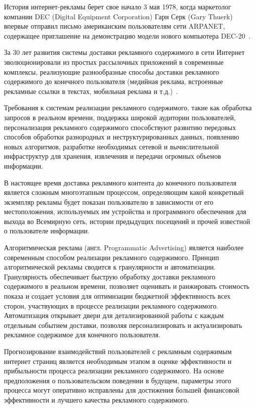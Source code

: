 
История интернет-рекламы берет свое начало 3 мая 1978, когда маркетолог компании DEC (Digital Equipment Corporation) 
Гари Серк (Gary Thuerk) впервые отправил письмо американским пользователям сети ARPANET, содержащее приглашение
на демонстрацию модели нового компьютера DEC-20~\autocite{online:spam}.

За 30 лет развития системы доставки рекламного содержимого в сети Интернет эволюционировали из простых рассылочных
приложений в современные комплексы, реализующие разнообразные способы доставки рекламного содержимого до 
конечного пользователя (медийная реклама, встроенные рекламные ссылки в текстах, мобильная реклама и т.д.)~\autocite{online:google}.

Требования к системам реализации рекламного содержимого, такие как обработка запросов в реальном времени, 
поддержка широкой аудитории пользователей, персонализация рекламного содержимого способствуют развитию
передовых способов обработки разнородных и неструктурированных данных, появлению новых алгоритмов, разработке
необходимых сетевой и вычислительной инфраструктур для хранения, извлечения и передачи огромных объемов информации.

В настоящее время доставка рекламного контента до конечного пользователя является сложным многоэтапным процессом, 
определяющим какой конкретный экземпляр рекламы будет показан пользователю в зависимости от его местоположения,
используемых им устройства и программного обеспечения для выхода во Всемирную сеть, истории предыдущих
посещений и прочей известной о пользователе информации.

Алгоритмическая реклама (англ. Programmatic Advertising) является наиболее современным способом реализации 
рекламного содержимого. Принцип алгоритмической рекламы сводится к гранулярности и автоматизации. Гранулярность
обеспечивает быструю обработку доставки рекламного содержимого в реальном времени, позволяет оценивать и ранжировать
стоимость показа и создает условия для оптимизации бюджетной эффективность всех сторон, участвующих в процессе 
реализации рекламного содержимого. Автоматизация открывает двери для детализированной работы с каждым отдельным событием доставки,
позволяя персонализировать и актуализировать рекламное содержимое для конечного пользователя.

Прогнозирование взаимодействий пользователей с рекламным содержимым интернет страниц является необходимым этапом
в оценке эффективности и прибыльности процесса реализации рекламного содержимого. На основе предположения о 
пользовательском поведении в будущем, параметры этого процесса могут оперативно исправлены для достижения большей
финансовой эффективности и лучшего качества рекламного содержимого.

